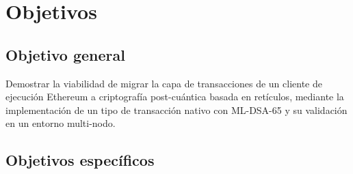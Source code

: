 \section{Objetivos}

\subsection{Objetivo general}

Demostrar la viabilidad de migrar la capa de transacciones de un cliente de ejecución Ethereum a criptografía post-cuántica basada en retículos, mediante la implementación de un tipo de transacción nativo con ML-DSA-65 y su validación en un entorno multi-nodo.

\subsection{Objetivos específicos}


